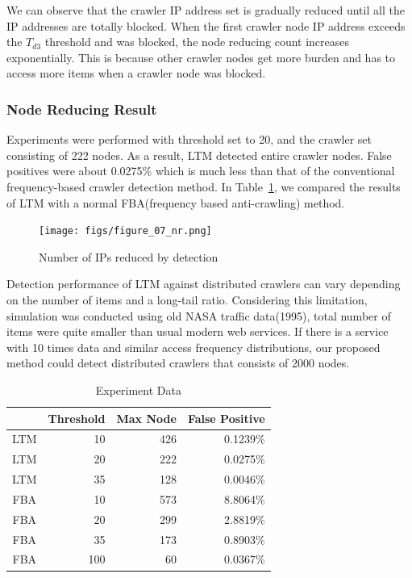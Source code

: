\documentclass[sigconf,review]{acmart}
\begin{document}
We can observe that the crawler IP address set is gradually reduced until all the IP addresses are totally blocked. When the first crawler node IP address exceeds the $T_{d3}$ threshold and was blocked, the node reducing count increases exponentially. This is because other crawler nodes get more burden and has to access more items when a crawler node was blocked.\newline

\subsubsection{Node Reducing Result}
 
Experiments were performed with threshold set to 20, and the crawler set consisting of 222 nodes. As a result, LTM detected entire crawler nodes. False positives were about 0.0275\% which is much less than that of the conventional frequency-based crawler detection method. In Table~\ref{tab:exp1}, we compared the results of LTM with a normal FBA(frequency based anti-crawling) method.

\begin{figure}[H]
    \centering
    \texttt{[image: figs/figure\_07\_nr.png]}
    \caption{Number of IPs reduced by detection}
    \label{fig:fig7}
\end{figure}

Detection performance of LTM against distributed crawlers can vary depending on the number of items and a long-tail ratio. Considering this limitation, simulation was conducted using old NASA traffic data(1995), total number of items were quite smaller than usual modern web services. If there is a service with 10 times data and similar access frequency distributions, our proposed method could detect distributed crawlers that consists of 2000 nodes.


\begin{table}[H]
  \caption{Experiment Data}
    \begin{tabular}{ c | r | r | r }
    \hline
    & Threshold & Max Node & False Positive \\ \hline
    LTM & 10 & 426 & 0.1239\% \\ 
    LTM & 20 & 222 & 0.0275\% \\ 
    LTM & 35 & 128 & 0.0046\% \\ 
    FBA & 10 & 573 & 8.8064\% \\
    FBA & 20 & 299 & 2.8819\% \\ 
    FBA & 35 & 173 & 0.8903\% \\ 
    FBA & 100 & 60 & 0.0367\% \\ \hline
    \end{tabular}
    \label{tab:exp1}
\end{table}
\end{document}
